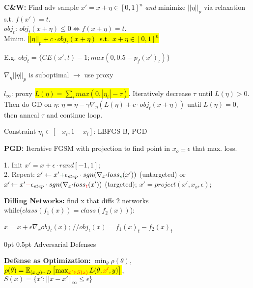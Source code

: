 \documentclass[11pt,landscape,a4paper,fleqn]{article}
\makeatletter
\renewcommand{\section}{\@startsection{section}{1}{0mm}%
                                {0pt}%
                                {0.5pt}%
                                {\color{myorange}\sffamily\small\bfseries}}
\newcommand{\mhl}[1]{\setlength{\fboxsep}{0pt}\colorbox{yellow}{#1}}
\makeatother
\begin{document}
\begin{multicols*}{4}
\textbf{C\&W:} Find adv sample $x' = x + \eta \in [0,1]^n$ \textit{and} minimize $||\eta||_p$ via relaxation s.t. $f(x') = t$.\\
$obj_t$: $obj_t(x+\eta) \leq 0 \Leftrightarrow f(x+\eta) = t$.\\
Minim. \mbox{\hl{$||\eta||_p + c \cdot obj_t(x+\eta)$ s.t. $x+\eta \in [0,1]^n$}}


E.g. {\fontsize{9.5}{6}\selectfont \mbox{$obj_t = \{ CE(x', t) - 1; max(0, 0.5 - p_f(x')_t)\}$}}

$\nabla_\eta ||\eta||_p$ is suboptimal $\rightarrow$ use proxy 

$l_\infty$: proxy \mhl{$L(\eta) = \sum_i max(0, |\eta_i| - \tau)$}. Iteratively decrease $\tau$ until $L(\eta)>0$. Then do GD on $\eta$: $\eta = \eta - \gamma \nabla_\eta(L(\eta) + c \cdot obj_t(x+\eta))$ until $L(\eta) = 0$, then anneal $\tau$ and continue loop.

Constraint $\eta_i \in [-x_i,1-x_i]$: LBFGS-B, PGD

\vspace*{1mm}


\textbf{PGD:} Iterative FGSM with projection to find point in $x_o \pm \epsilon$ that max. loss.

1. Init $x' = x + \epsilon \cdot rand[-1,1]$;\\
2. Repeat: $x' \leftarrow x' \textcolor{darkgreen}{+} \epsilon_{step} \cdot sgn(\nabla_{x'} loss_{\textcolor{darkgreen}{s}} (x'))$ (untargeted) or $x'\hspace*{-0.5mm} \leftarrow x' \textcolor{red}{-} \epsilon_{step} \cdot sgn(\nabla_{x'} loss_{\textcolor{red}{t}} (x'))$ (targeted);
$x' = project(x', x_o, \epsilon)$;
\vspace*{1mm}

\textbf{Diffing Networks:} find x that diffs 2 networks\\
while($class(f_1(x)) = class(f_2(x))$):

\quad $x = x + \epsilon \nabla_x obj_t(x)$;  {\fontsize{9.5}{6}\selectfont /\!\!/$obj_t(x) = f_1(x)_t - f_2(x)_t$}

\section{Adversarial Defenses}

\textbf{Defense as Optimization:} $\min_\theta \rho(\theta)$,
 \colorbox{yellow}{$\rho(\theta) = \mathbb{E}_{(x,y) \sim D} \left[ \max_{\textcolor{red}{x' \in S(x)}} L(\theta, \textcolor{red}{x'}, y) \right]$},\\
$S(x) = \{ x': ||x - x'||_\infty \leq \epsilon \}$


\end{multicols*}
\end{document}
